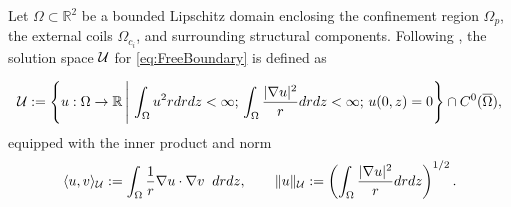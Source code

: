Let $\Omega \subset \mathbb{R}^2$ be a bounded Lipschitz domain enclosing the confinement region $\Omega_p$, the external coils $\Omega_{c_i}$, and surrounding structural components.  
Following \cite{Gr:1999}, the solution space $\mathcal{U}$ for \eqref{eq:FreeBoundary} is defined as

\begin{equation}\label{eq:Soln_space}
    \mathcal{U}:=\left\{u:\Omega\rightarrow \mathbb{R} \,\Bigg| \,\int_\Omega u^2rdrdz<\infty; \,  \int_\Omega\frac{|\nabla u|^2}{r}drdz<\infty; \, u(0,z)=0 \right\}\cap C^0(\overline{\Omega}),
\end{equation}
%
equipped with the inner product and norm
%
\begin{equation}\label{eq:inner_prod_norm}
        \langle u,v\rangle_{\mathcal{U}} := \int_{\Omega} \frac{1}{r} \nabla u\cdot\nabla v \;\;drdz,\qquad \| u \|_{\mathcal{U}} :=\left(\int_\Omega\frac{|\nabla u|^2}{r} drdz\right)^{1/2}.
\end{equation}
%

